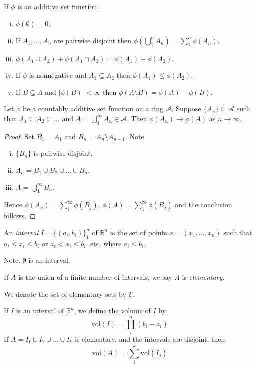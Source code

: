 \documentclass[11pt]{article}
\begin{document}
\begin{remark}
    If $\phi$ is an additive set function,
    \begin{enumerate} [(i), nosep, left=0pt]
        \item $\phi(\emptyset) = 0$.
        \item If $A_1, \dots, A_n$ are pairwise disjoint then $\phi(\bigcup_1^n A_n) = \sum_1^n \phi(A_n)$.
        \item $\phi(A_1 \cup A_2) + \phi(A_1 \cap A_2) = \phi(A_1) + \phi(A_2)$.
        \item If $\phi$ is nonnegative and $A_1 \subseteq A_2$ then $\phi(A_1) \le \phi(A_2)$.
        \item If $B \subseteq A$ and $|\phi(B)| < \infty$ then $\phi(A \setminus B) = \phi(A) - \phi(B)$. 
    \end{enumerate}
\end{remark}

\begin{theorem}
    Let $\phi$ be a countably additive set function on a ring $\mathscr{A}$. Suppose $\{ A_n \} \subseteq \mathscr{A}$ such that $A_1 \subseteq A_2 \subseteq \dots$ and $A = \bigcup_1^\infty A_n \in \mathscr{A}$. Then $\phi(A_n) \to \phi(A)$ as $n \to \infty$. 
\end{theorem}
\begin{proof}
    Set $B_1 = A_1$ and $B_n = A_n \setminus A_{n-1}$. Note \begin{enumerate} [(i), nosep, left=0pt]
        \item $\{ B_n \}$ is pairwise disjoint.
        \item $A_n = B_1 \cup B_2 \cup \dots \cup B_n$.
        \item $A = \bigcup_1^\infty B_n$.
    \end{enumerate}
    Hence $\phi(A_n) = \sum_1^\infty \phi(B_j)$, $\phi(A) = \sum_1^\infty \phi(B_j)$ and the conclusion follows.
\end{proof}

\begin{definition}
    An \emph{interval} $I = \{ (a_i, b_i) \}_1^n$ of $\mathbb{R}^n$ is the set of points $x = (x_1, \dots, x_n)$ such that $a_i \le x_i \le b_i$ or $a_i < x_i \le b_i$, etc. where $a_i \le b_i$. 
\end{definition}
Note. $\emptyset$ is an interval. 

\begin{definition}
    If $A$ is the union of a finite number of intervals, we say $A$ is \emph{elementary}.
\end{definition}
We denote the set of elementary sets by $\mathscr{E}$. 

\begin{definition}
    If $I$ is an interval of $\mathbb{R}^n$, we define the volume of $I$ by $$\mathrm{vol}(I) = \prod_i^n (b_i - a_i)$$
    If $A = I_1 \cup I_2 \cup \dots \cup I_k$ is elementary, and the intervals are disjoint, then $$\mathrm{vol}(A) = \sum_1^k \mathrm{vol}(I_j)$$
\end{definition}
\end{document}
